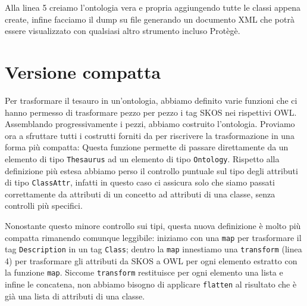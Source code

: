 Alla linea 5 creiamo l'ontologia vera e propria aggiungendo tutte le classi appena create, infine facciamo il dump su file generando un documento XML che potrà essere visualizzato con qualsiasi altro strumento incluso Protègè.
\section{Versione compatta}
Per trasformare il tesauro in un'ontologia, abbiamo definito varie funzioni che ci hanno permesso di trasformare pezzo per pezzo i tag SKOS nei rispettivi OWL. Assemblando progressivamente i pezzi, abbiamo costruito l'ontologia. Proviamo ora a sfruttare tutti i costrutti forniti da \cduce per riscrivere la trasformazione in una forma più compatta:
Questa funzione permette di passare direttamente da un elemento di tipo \verb|Thesaurus| ad un elemento di tipo \verb|Ontology|. Rispetto alla definizione più estesa abbiamo perso il controllo puntuale sul tipo degli attributi di tipo \verb|ClassAttr|, infatti in questo caso \cduce ci assicura solo che siamo passati correttamente da attributi di un concetto ad attributi di una classe, senza controlli più specifici.

Nonostante questo minore controllo sui tipi, questa nuova definizione è molto più compatta rimanendo comunque leggibile: iniziamo con una \verb|map| per trasformare il tag \verb|Description| in un tag \verb|Class|; dentro la \verb|map| innestiamo una \verb|transform| (linea 4) per trasformare gli attributi da SKOS a OWL per ogni elemento estratto con la funzione \verb|map|. Siccome \verb|transform| restituisce per ogni elemento una lista e infine le concatena, non abbiamo bisogno di applicare \verb|flatten| al risultato che è già una lista di attributi di una classe.

